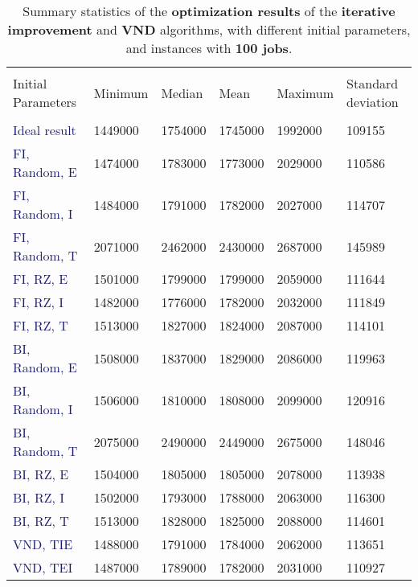\documentclass[
12pt,
a4paper,
oneside,
headinclude,
footinclude]{article}
\theoremstyle{definition} %
\begin{document}
    \begin{table}[H]
    \centering %
    \begin{tabular}{l l l l l l} %
        \hline
        \hline 
        \\[-1.5ex]
        \textcolor{BrickRed}{Initial Parameters} & \textcolor{BrickRed}{Minimum} & \textcolor{BrickRed}{Median} & \textcolor{BrickRed}{Mean} & \textcolor{BrickRed}{Maximum} & \textcolor{BrickRed}{Standard deviation}\\ [0.5ex]
        \hline %
        \\[-1.5ex]
        \textcolor{MidnightBlue}{Ideal result}      & 1449000 & 1754000 &  1745000 & 1992000 & 109155 \\   
        \textcolor{MidnightBlue}{FI, Random, E} 	& 1474000 & 1783000 & 1773000 & 2029000 & 110586 \\  
        \textcolor{MidnightBlue}{FI, Random, I}     & 1484000 & 1791000 & 1782000 & 2027000 & 114707 \\
        \textcolor{MidnightBlue}{FI, Random, T}     & 2071000 & 2462000 & 2430000 & 2687000 & 145989 \\
        \textcolor{MidnightBlue}{FI, RZ, E}         & 1501000 & 1799000 & 1799000 & 2059000 & 111644 \\
        \textcolor{MidnightBlue}{FI, RZ, I}         & 1482000 & 1776000 & 1782000 & 2032000 & 111849 \\
        \textcolor{MidnightBlue}{FI, RZ, T}         & 1513000 & 1827000 & 1824000 & 2087000 & 114101 \\
        \textcolor{MidnightBlue}{BI, Random, E}     & 1508000 & 1837000 & 1829000 & 2086000 & 119963 \\
        \textcolor{MidnightBlue}{BI, Random, I}     & 1506000 & 1810000 & 1808000 & 2099000 & 120916 \\
        \textcolor{MidnightBlue}{BI, Random, T}     & 2075000 & 2490000 & 2449000 & 2675000 & 148046 \\
        \textcolor{MidnightBlue}{BI, RZ, E}         & 1504000 & 1805000 & 1805000 & 2078000 & 113938 \\
        \textcolor{MidnightBlue}{BI, RZ, I}         & 1502000 & 1793000 & 1788000 & 2063000 & 116300 \\
        \textcolor{MidnightBlue}{BI, RZ, T}         & 1513000 & 1828000 & 1825000 & 2088000 & 114601 \\
        \textcolor{MidnightBlue}{VND, TIE}         & 1488000    &   1791000 &  1784000   &   2062000  & 113651\\
        \textcolor{MidnightBlue}{VND, TEI}         & 1487000    &   1789000 &  1782000   &   2031000  & 110927\\
        [1ex] %
        \hline %
    \end{tabular}
    \caption{\label{tab:100-res}Summary statistics of the \textbf{optimization results} of the \textbf{iterative improvement} and \textbf{VND} algorithms, with different initial parameters, and instances with \textbf{100 jobs}.}
    \end{table} 
\end{document}
